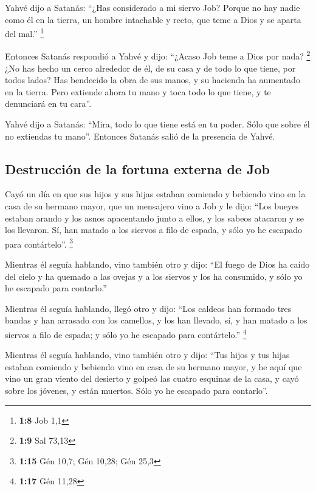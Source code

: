 \begin{paracol}{2}
 Yahvé dijo a Satanás: ``¿Has considerado a mi siervo Job?
Porque no hay nadie como él en la tierra, un hombre intachable y recto,
que teme a Dios y se aparta del mal.'' \footnote{\textbf{1:8} Job 1,1}

 Entonces Satanás respondió a Yahvé y dijo: ``¿Acaso Job
teme a Dios por nada? \footnote{\textbf{1:9} Sal 73,13} 
¿No has hecho un cerco alrededor de él, de su casa y de todo lo que
tiene, por todos lados? Has bendecido la obra de sus manos, y su
hacienda ha aumentado en la tierra.  Pero extiende ahora
tu mano y toca todo lo que tiene, y te denunciará en tu cara''.

 Yahvé dijo a Satanás: ``Mira, todo lo que tiene está en
tu poder. Sólo que sobre él no extiendas tu mano''. Entonces Satanás
salió de la presencia de Yahvé.

\hypertarget{destrucciuxf3n-de-la-fortuna-externa-de-job}{%
\subsection{Destrucción de la fortuna externa de
Job}\label{destrucciuxf3n-de-la-fortuna-externa-de-job}}

 Cayó un día en que sus hijos y sus hijas estaban
comiendo y bebiendo vino en la casa de su hermano mayor, 
que un mensajero vino a Job y le dijo: ``Los bueyes estaban arando y los
asnos apacentando junto a ellos,  y los sabeos atacaron y
se los llevaron. Sí, han matado a los siervos a filo de espada, y sólo
yo he escapado para contártelo''. \footnote{\textbf{1:15} Gén 10,7; Gén
  10,28; Gén 25,3}

 Mientras él seguía hablando, vino también otro y dijo:
``El fuego de Dios ha caído del cielo y ha quemado a las ovejas y a los
siervos y los ha consumido, y sólo yo he escapado para contarlo.''

 Mientras él seguía hablando, llegó otro y dijo: ``Los
caldeos han formado tres bandas y han arrasado con los camellos, y los
han llevado, sí, y han matado a los siervos a filo de espada; y sólo yo
he escapado para contártelo.'' \footnote{\textbf{1:17} Gén 11,28}

 Mientras él seguía hablando, vino también otro y dijo:
``Tus hijos y tus hijas estaban comiendo y bebiendo vino en casa de su
hermano mayor,  y he aquí que vino un gran viento del
desierto y golpeó las cuatro esquinas de la casa, y cayó sobre los
jóvenes, y están muertos. Sólo yo he escapado para contarlo''.


\end{paracol}
